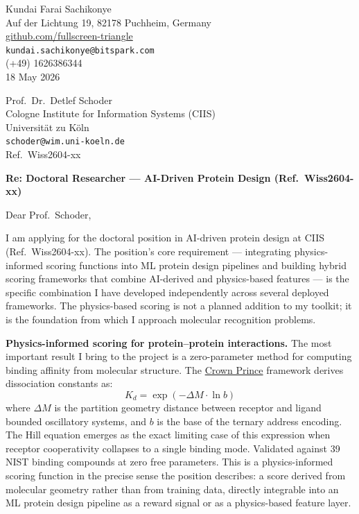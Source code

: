 \documentclass[12pt,a4paper]{article}
\begin{document}
\begin{flushright}
Kundai Farai Sachikonye \\
Auf der Lichtung 19, 82178 Puchheim, Germany \\
\href{https://github.com/fullscreen-triangle}{github.com/fullscreen-triangle} \\
\texttt{kundai.sachikonye@bitspark.com} \\
(+49) 1626386344 \\[6pt]
18 May 2026
\end{flushright}

\vspace{1em}

Prof.\ Dr.\ Detlef Schoder \\
Cologne Institute for Information Systems (CIIS) \\
Universität zu Köln \\
\texttt{schoder@wim.uni-koeln.de} \\
Ref.\ Wiss2604-xx

\vspace{1.5em}

\textbf{Re: Doctoral Researcher --- AI-Driven Protein Design (Ref.\ Wiss2604-xx)}

\vspace{1em}

Dear Prof.\ Schoder,

I am applying for the doctoral position in AI-driven protein design at CIIS
(Ref.\ Wiss2604-xx).
The position's core requirement --- integrating physics-informed scoring
functions into ML protein design pipelines and building hybrid scoring
frameworks that combine AI-derived and physics-based features --- is the
specific combination I have developed independently across several deployed
frameworks. The physics-based scoring is not a planned addition to my
toolkit; it is the foundation from which I approach molecular recognition problems.

\textbf{Physics-informed scoring for protein--protein interactions.}
The most important result I bring to the project is a zero-parameter method
for computing binding affinity from molecular structure.
The \href{https://github.com/fullscreen-triangle/crown-prince}{Crown Prince}
framework derives dissociation constants as:
\[
K_d = \exp\!\left(-\Delta M \cdot \ln b\right)
\]
where $\Delta M$ is the partition geometry distance between receptor and ligand
bounded oscillatory systems, and $b$ is the base of the ternary address encoding.
The Hill equation emerges as the exact limiting case of this expression when
receptor cooperativity collapses to a single binding mode.
Validated against 39 NIST binding compounds at zero free parameters.
This is a physics-informed scoring function in the precise sense the position
describes: a score derived from molecular geometry rather than from training data,
directly integrable into an ML protein design pipeline as a reward signal or
as a physics-based feature layer.
\end{document}
